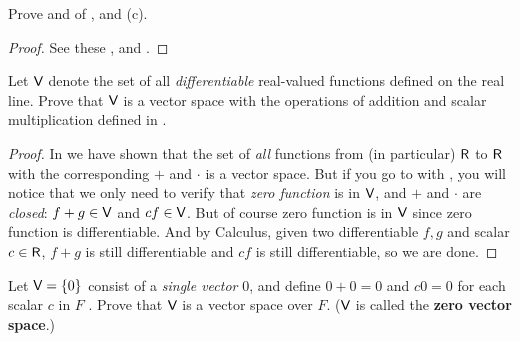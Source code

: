 \begin{exercise} \label{exercise 1.2.9}
Prove  and  of , and (c).
\end{exercise}

\begin{proof}
See these ,  and .
\end{proof}

\begin{exercise} \label{exercise 1.2.10}
Let \(\textsf{V}\) denote the set of all \emph{differentiable} real-valued functions defined on the real line.
Prove that \(\textsf{V}\) is a vector space with the operations of
addition and scalar multiplication defined in .
\end{exercise}

\begin{proof}
In  we have shown that the set of \emph{all} functions from (in particular) \(\textsf{R}\) to \(\textsf{R}\) with the corresponding \(+\) and \(\cdot\) is a vector space.
But if you go to  with , you will notice that we only need to verify that \emph{zero function} is in \(\textsf{V}\), and \(+\) and \(\cdot\) are \emph{closed}: \(f + g \in \textsf{V}\) and \(c f \in \textsf{V}\).
But of course zero function is in \(\textsf{V}\) since zero function is differentiable.
And by Calculus, given two differentiable \(f, g\) and scalar \(c \in \textsf{R}\), \(f + g\) is still differentiable and \(c f\) is still differentiable, so we are done.
\end{proof}

\begin{exercise} \label{exercise 1.2.11}
Let \(\textsf{V} = \{ 0 \}\) consist of a \emph{single vector} \(0\), and define \(0 + 0 = 0\)  and \(c0 = 0\) for each scalar \(c\) in \(F\) .
Prove that \(\textsf{V}\) is a vector space over \(F\).
(\(\textsf{V}\) is called the \textbf{zero vector space}.)
\end{exercise}

